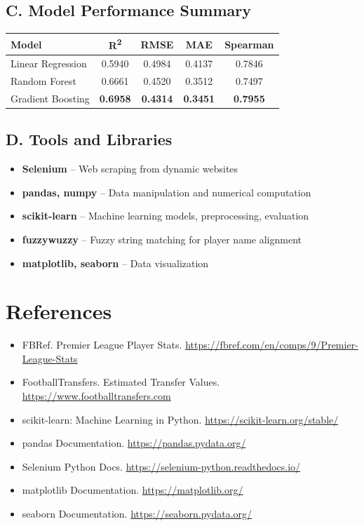 \documentclass[12pt,a4paper]{article}
\begin{document}
\subsection*{C. Model Performance Summary}
\begin{center}
\begin{tabular}{lcccc}
\toprule
\textbf{Model} & \textbf{R\textsuperscript{2}} & \textbf{RMSE} & \textbf{MAE} & \textbf{Spearman} \\
\midrule
Linear Regression & 0.5940 & 0.4984 & 0.4137 & 0.7846 \\
Random Forest     & 0.6661 & 0.4520 & 0.3512 & 0.7497 \\
Gradient Boosting & \textbf{0.6958} & \textbf{0.4314} & \textbf{0.3451} & \textbf{0.7955} \\
\bottomrule
\end{tabular}
\end{center}

\subsection*{D. Tools and Libraries}
\begin{itemize}
    \item \textbf{Selenium} – Web scraping from dynamic websites
    \item \textbf{pandas, numpy} – Data manipulation and numerical computation
    \item \textbf{scikit-learn} – Machine learning models, preprocessing, evaluation
    \item \textbf{fuzzywuzzy} – Fuzzy string matching for player name alignment
    \item \textbf{matplotlib, seaborn} – Data visualization
\end{itemize}

\newpage
\section*{References}

\begin{itemize}
    \item FBRef. Premier League Player Stats. \url{https://fbref.com/en/comps/9/Premier-League-Stats}
    \item FootballTransfers. Estimated Transfer Values. \url{https://www.footballtransfers.com}
    \item scikit-learn: Machine Learning in Python. \url{https://scikit-learn.org/stable/}
    \item pandas Documentation. \url{https://pandas.pydata.org/}
    \item Selenium Python Docs. \url{https://selenium-python.readthedocs.io/}
    \item matplotlib Documentation. \url{https://matplotlib.org/}
    \item seaborn Documentation. \url{https://seaborn.pydata.org/}
\end{itemize}
\end{document}
